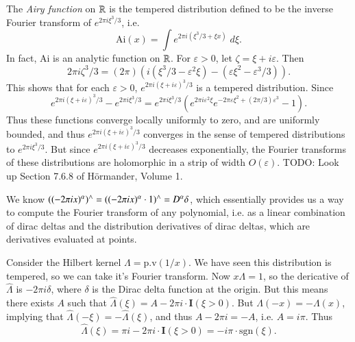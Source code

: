 \begin{example}
    The \emph{Airy function} on $\operatorname{\mathbb{R}}$ is the tempered distribution defined to be the inverse Fourier transform of $e^{2 \pi i \xi^3 / 3}$, i.e.
    \[ \text{Ai}(x) = \int e^{2 \pi i (\xi^3 / 3 + \xi x)}\; d\xi. \]
    In fact, $\text{Ai}$ is an analytic function on $\operatorname{\mathbb{R}}$. For $\varepsilon > 0$, let $\zeta = \xi + i \varepsilon$. Then
    \[ 2 \pi i \zeta^3 / 3 = (2\pi) \left( i ( \xi^3 / 3 - \varepsilon^2 \xi) - (\varepsilon \xi^2 - \varepsilon^3 / 3) \right). \]
    This shows that for each $\varepsilon > 0$, $e^{2 \pi i (\xi + i \varepsilon)^3 / 3}$ is a tempered distribution. Since
    \[ e^{2 \pi i (\xi + i \varepsilon)^3 / 3} - e^{2 \pi i \xi^3 / 3} = e^{2 \pi i \xi^3 / 3} \left( e^{2 \pi i \varepsilon^2 \xi} e^{- 2 \pi \varepsilon \xi^2 + (2 \pi / 3) \varepsilon^3} - 1 \right).  \]
    Thus these functions converge locally uniformly to zero, and are uniformly bounded, and thus $e^{2 \pi i(\xi + i \varepsilon)^3 / 3}$ converges in the sense of tempered distributions to $e^{2 \pi i \xi^3 / 3}$. But since $e^{2\pi i (\xi + i \varepsilon)^3 / 3}$ decreases exponentially, the Fourier transforms of these distributions are holomorphic in a strip of width $O(\varepsilon)$. TODO: Look up Section 7.6.8 of H\"{o}rmander, Volume 1.
\end{example}

%
%

\begin{example}
    We know $((-2 \pi i x)^\alpha)^\wedge = ((- 2 \pi i x)^\alpha \cdot 1)^\wedge = D^\alpha \delta$, which essentially provides us a way to compute the Fourier transform of any polynomial, i.e. as a linear combination of dirac deltas and the distribution derivatives of dirac deltas, which are derivatives evaluated at points.
\end{example}

\begin{example}
    Consider the Hilbert kernel $\Lambda = \text{p.v}(1/x)$. We have seen this distribution is tempered, so we can take it's Fourier transform. Now $x \Lambda = 1$, so the dericative of $\widehat{\Lambda}$ is $- 2 \pi i \delta$, where $\delta$ is the Dirac delta function at the origin. But this means there exists $A$ such that $\widehat{\Lambda}(\xi) = A - 2 \pi i \cdot \mathbf{I}(\xi > 0)$. But $\Lambda(-x) = - \Lambda(x)$, implying that $\widehat{\Lambda}(-\xi) = -\widehat{\Lambda}(\xi)$, and thus $A - 2 \pi i = -A$, i.e. $A = i \pi$. Thus
    \[ \widehat{\Lambda}(\xi) = \pi i - 2 \pi i \cdot \mathbf{I}(\xi > 0) = - i \pi \cdot \text{sgn}(\xi). \]
\end{example}

